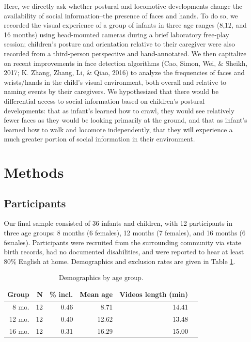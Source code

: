 \documentclass[10pt, letterpaper]{article}
\begin{document}
Here, we directly ask whether postural and locomotive developments
change the availability of social information--the presence of faces and
hands. To do so, we recorded the visual experience of a group of infants
in three age ranges (8,12, and 16 months) using head-mounted cameras
during a brief laboratory free-play session; children's posture and
orientation relative to their caregiver were also recorded from a
third-person perspective and hand-annotated. We then capitalize on
recent improvements in face detection algorithms (Cao, Simon, Wei, \&
Sheikh, 2017; K. Zhang, Zhang, Li, \& Qiao, 2016) to analyze the
frequencies of faces and wrists/hands in the child's visual environment,
both overall and relative to naming events by their caregivers. We
hypothesized that there would be differential access to social
information based on children's postural developments: that as infant's
learned how to crawl, they would see relatively fewer faces as they
would be looking primarily at the ground, and that as infant's learned
how to walk and locomote independently, that they will experience a much
greater portion of social information in their environment.

\section{Methods}\label{methods}

\subsection{Participants}\label{participants}

Our final sample consisted of 36 infants and children, with 12
participants in three age groups: 8 months (6 females), 12 months (7
females), and 16 months (6 females). Participants were recruited from
the surrounding community via state birth records, had no documented
disabilities, and were reported to hear at least 80\% English at home.
Demographics and exclusion rates are given in Table \ref{tab:pop}.

\begin{table}[H]
\centering
\begin{tabular}{rrrrrr}
  \hline
 Group & N & \% incl. & Mean age & Videos length (min) \\ 
  \hline
   8 mo. &   12 & 0.46 & 8.71 & 14.41 \\ 
   12 mo. &  12 & 0.40 & 12.62 & 13.48 \\ 
   16 mo. &  12 & 0.31 & 16.29 & 15.00\\ 
   \hline
\end{tabular}
\caption{\label{tab:pop} Demographics by age group.}
\end{table}
\end{document}
